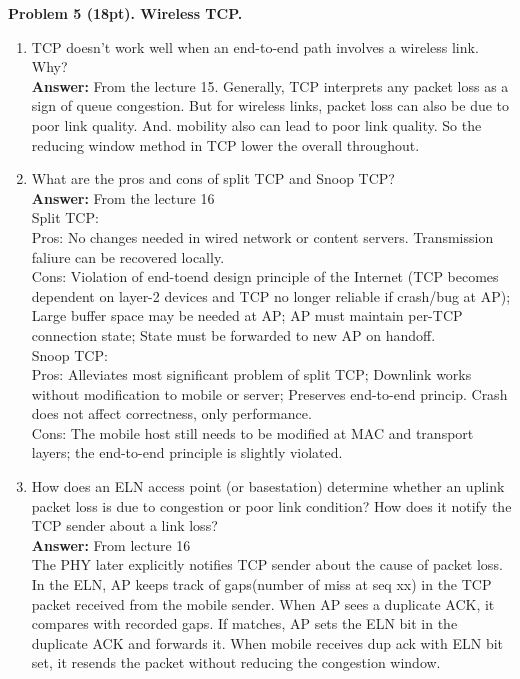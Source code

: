 \documentclass[12pt]{article}
\begin{document}
\noindent \textbf{Problem 5 (18pt). Wireless TCP.\\}
\begin{enumerate}
\item TCP doesn’t work well when an end-to-end path involves a wireless link. Why?\\
\textbf{Answer:} From the lecture 15. Generally, TCP interprets any packet loss as a sign of queue congestion. But for wireless links, packet loss can also be due to poor link quality. And. mobility also can lead to poor link quality. So the reducing window method in TCP lower the overall throughout.
\item What are the pros and cons of split TCP and Snoop TCP?\\
\textbf{Answer:} From the lecture 16\\
Split TCP:\\
Pros: No changes needed in wired network or content servers. Transmission faliure can be recovered locally.\\
Cons: Violation of end-toend design principle of the Internet (TCP becomes dependent on layer-2 devices and TCP no longer reliable if crash/bug at AP); Large buffer space may be needed at AP; AP must maintain per-TCP connection state; State must be forwarded to new AP on handoff.\\
Snoop TCP:\\
Pros: Alleviates most significant problem of split TCP; Downlink works without modification to mobile or server; Preserves end-to-end princip. Crash does not affect correctness, only performance.\\
Cons: The mobile host still needs to be modified at MAC and transport layers; the end-to-end principle is slightly violated.
\item How does an ELN access point (or basestation) determine whether an uplink packet loss is due to congestion or poor link condition? How does it notify the TCP sender about a link loss?\\
\textbf{Answer:} From lecture 16\\
The PHY later explicitly notifies TCP sender about the cause of packet loss.\\
In the ELN, AP keeps track of gaps(number of miss at seq xx) in the TCP packet received from the mobile sender. When AP sees a duplicate ACK, it compares with recorded gaps. If matches, AP sets the ELN bit in the duplicate ACK and forwards it. When mobile receives dup ack with ELN bit set, it resends the packet without reducing the congestion window.
\end{enumerate}
\end{document}
